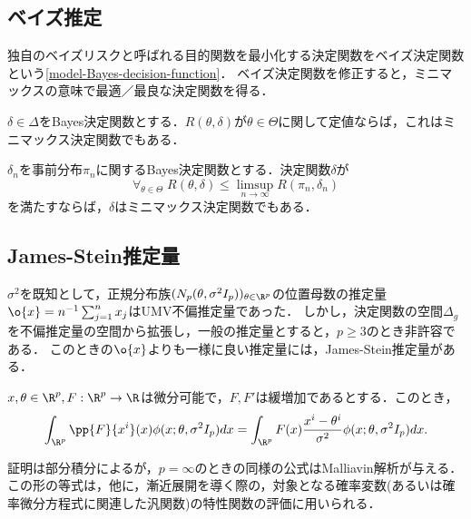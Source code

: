 \documentclass[uplatex,dvipdfmx]{jsreport}
\begin{document}
\subsection{ベイズ推定}

\begin{tcolorbox}[colframe=ForestGreen, colback=ForestGreen!10!white,breakable,colbacktitle=ForestGreen!40!white,coltitle=black,fonttitle=\bfseries\sffamily,
title=]
    独自のベイズリスクと呼ばれる目的関数を最小化する決定関数をベイズ決定関数という\ref{model-Bayes-decision-function}．
    ベイズ決定関数を修正すると，ミニマックスの意味で最適／最良な決定関数を得る．
\end{tcolorbox}

\begin{theorem}
    $\delta\in\Delta$をBayes決定関数とする．$R(\theta,\delta)$が$\theta\in\Theta$に関して定値ならば，これはミニマックス決定関数でもある．
\end{theorem}

\begin{theorem}
    $\delta_n$を事前分布$\pi_n$に関するBayes決定関数とする．決定関数$\delta$が
    \[\forall_{\theta\in\Theta}\;R(\theta,\delta)\le\limsup_{n\to\infty}R(\pi_n,\delta_n)\]
    を満たすならば，$\delta$はミニマックス決定関数でもある．
\end{theorem}

\subsection{James-Stein推定量}

\begin{tcolorbox}[colframe=ForestGreen, colback=ForestGreen!10!white,breakable,colbacktitle=ForestGreen!40!white,coltitle=black,fonttitle=\bfseries\sffamily,
title=]
    $\sigma^2$を既知として，正規分布族$(N_p(\theta,\sigma^2I_p))_{\theta\in\R^p}$の位置母数の推定量$\o{x}=n^{-1}\sum^n_{j=1}x_j$はUMV不偏推定量であった．
    しかし，決定関数の空間$\Delta_g$を不偏推定量の空間から拡張し，一般の推定量とすると，$p\ge3$のとき非許容である．
    このときの$\o{x}$よりも一様に良い推定量には，James-Stein推定量がある．
\end{tcolorbox}

\begin{lemma}
    $x,\theta\in\R^p,F:\R^p\to\R$は微分可能で，$F,F'$は緩増加であるとする．このとき，
    \[\int_{\R^p}\pp{F}{x^i}(x)\phi(x;\theta,\sigma^2I_p)dx=\int_{\R^p}F(x)\frac{x^i-\theta^i}{\sigma^2}\phi(x;\theta,\sigma^2I_p)dx.\]
\end{lemma}
\begin{remarks}[部分積分という手法]
    証明は部分積分によるが，$p=\infty$のときの同様の公式はMalliavin解析が与える．
    この形の等式は，他に，漸近展開を導く際の，対象となる確率変数(あるいは確率微分方程式に関連した汎関数)の特性関数の評価に用いられる．
\end{remarks}
\end{document}
